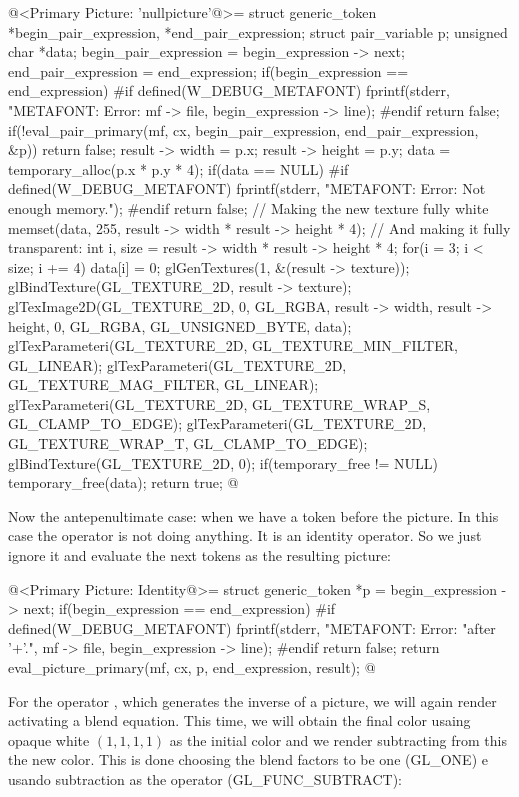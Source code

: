 {{{{{\iniciocodigo
@<Primary Picture: 'nullpicture'@>=
struct generic_token *begin_pair_expression, *end_pair_expression;
struct pair_variable p;
unsigned char *data;
begin_pair_expression = begin_expression -> next;
end_pair_expression = end_expression;
if(begin_expression == end_expression){
#if defined(W_DEBUG_METAFONT)
  fprintf(stderr, "METAFONT: Error: %
          mf -> file, begin_expression -> line);
#endif
  return false;
}
if(!eval_pair_primary(mf, cx, begin_pair_expression, end_pair_expression, &p))
  return false;
result -> width = p.x;
result -> height = p.y;
data = temporary_alloc(p.x * p.y * 4);
if(data == NULL){
#if defined(W_DEBUG_METAFONT)
  fprintf(stderr, "METAFONT: Error: Not enough memory.\n");
#endif
  return false;
}
// Making the new texture fully white
memset(data, 255, result -> width * result -> height * 4);
{ // And making it fully transparent:
  int i, size = result -> width * result -> height * 4;
  for(i = 3; i < size; i += 4)
    data[i] = 0;
}
glGenTextures(1, &(result -> texture));
glBindTexture(GL_TEXTURE_2D, result -> texture);
glTexImage2D(GL_TEXTURE_2D, 0, GL_RGBA, result -> width, result -> height, 0,
             GL_RGBA, GL_UNSIGNED_BYTE, data);
glTexParameteri(GL_TEXTURE_2D, GL_TEXTURE_MIN_FILTER, GL_LINEAR);
glTexParameteri(GL_TEXTURE_2D, GL_TEXTURE_MAG_FILTER, GL_LINEAR);
glTexParameteri(GL_TEXTURE_2D, GL_TEXTURE_WRAP_S, GL_CLAMP_TO_EDGE);
glTexParameteri(GL_TEXTURE_2D, GL_TEXTURE_WRAP_T, GL_CLAMP_TO_EDGE);
glBindTexture(GL_TEXTURE_2D, 0);
if(temporary_free != NULL)
  temporary_free(data);
return true;
@
\fimcodigo

Now the antepenultimate case: when we have a token \monoespaco{+}
before the picture. In this case the operator is not doing
anything. It is an identity operator. So we just ignore it and
evaluate the next tokens as the resulting picture:

\iniciocodigo
@<Primary Picture: Identity@>=
struct generic_token *p = begin_expression -> next;
if(begin_expression == end_expression){
#if defined(W_DEBUG_METAFONT)
  fprintf(stderr, "METAFONT: Error: %
                  "after '+'.\n", mf -> file, begin_expression -> line);
#endif
  return false;
}
return eval_picture_primary(mf, cx, p, end_expression, result);
@
\fimcodigo

For the operator \monoespaco{-}, which generates the inverse of a
picture, we will again render activating a blend equation. This time,
we will obtain the final color usaing opaque white $(1, 1, 1, 1)$ as
the initial color and we render subtracting from this the new
color. This is done choosing the blend factors to be one (GL\_ONE) e
usando subtraction as the operator (GL\_FUNC\_SUBTRACT):

}}}}}

